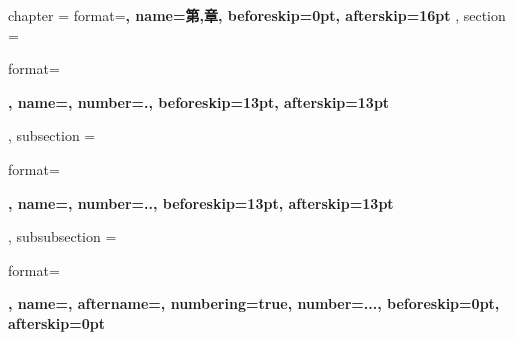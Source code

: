 {}
{
    \ctexset
    {
        chapter = 
        {
            format=\centering{}\bfseries,
            name={第,章},
            beforeskip=0pt,
            afterskip=16pt
        },
        section =
        {
            format=\raggedright{}\bfseries,
            name={},
            number=.,
            beforeskip=13pt,
            afterskip=13pt
        },
        subsection =
        {
            format=\raggedright{}\bfseries,
            name={},
            number=..,
            beforeskip=13pt,
            afterskip=13pt
        },
        subsubsection =
        {
            format=\raggedright{}\bfseries,
            name={},
            aftername=\quad,
            numbering=true,
            number=...,
            beforeskip=0pt,
            afterskip=0pt
        }
    }
}